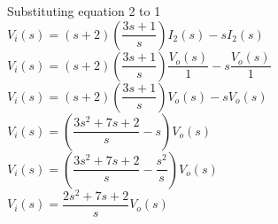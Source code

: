 \documentclass[11pt,letterpaper]{article}
\begin{document}
\begin{minipage}{.5\textwidth}
	Substituting equation 2 to 1\\	
	
		$V_i(s)=(s+2)\left(\dfrac{3s+1}{s}\right)I_2(s)-sI_2(s)$\\

		$V_i(s)=(s+2)\left(\dfrac{3s+1}{s}\right)\dfrac{V_o(s)}{1}-s\dfrac{V_o(s)}{1}$\\

		$V_i(s)=(s+2)\left(\dfrac{3s+1}{s}\right)V_o(s)-sV_o(s)$\\

		$V_i(s)=\left(\dfrac{3s^2+7s+2}{s}-s\right)V_o(s)$\\
		
		$V_i(s)=\left(\dfrac{3s^2+7s+2}{s}-\dfrac{s^2}{s}\right)V_o(s)$\\

		$V_i(s)=\dfrac{2s^2+7s+2}{s}V_o(s)$\\
	
		\\
		
		\end{minipage}
\end{document}
